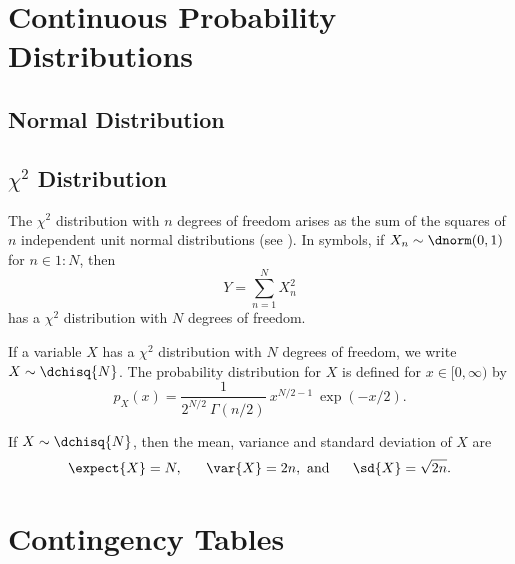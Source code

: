 \section{Continuous Probability Distributions}

\subsection{Normal Distribution}\label{section:stats-normal-distribution}



\subsection{$\chi^2$ Distribution}\label{section:stats-chi-squared-distribution}

The $\chi^2$ distribution with $n$ degrees of freedom arises as the
sum of the squares of $n$ independent unit normal distributions (see
).  In symbols, if $X_n \sim \dnorm(0,1)$
for $n \in 1{:}N$, then 
%
\begin{equation}
Y = \sum_{n=1}^N X_n^2
\end{equation}
%
has a $\chi^2$ distribution with $N$ degrees of freedom.

If a variable $X$ has a $\chi^2$ distribution with $N$ degrees of
freedom, we write $X \sim \dchisq{N}$.  The probability distribution
for $X$ is defined for $x \in [0,\infty)$ by
%
\begin{equation}
p_X(x) = \frac{1}{2^{N/2} \ \Gamma(n/2)} \ x^{N/2-1} \ \exp(-x/2).
\end{equation}
%

If $X \sim \dchisq{N}$, then the mean, variance and standard deviation of $X$ are
%
\begin{equation}
\expect{X} = N,
\ \ \ \ \ 
\var{X} = 2n, \mbox{ and}
\ \ \ \ \  
\sd{X} = \sqrt{2n}.
\end{equation}


\section{Contingency Tables}

